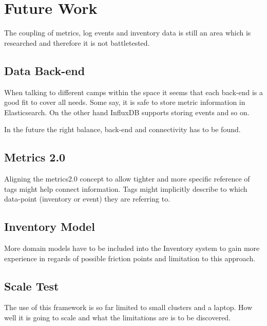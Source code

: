 \section{Future Work}

The coupling of metrics, log events and inventory data is still an area which is researched and therefore it is not battletested.

\subsection{Data Back-end}
When talking to different camps within the space it seems that each back-end is a good fit to cover all needs.
Some say, it is safe to store metric information in Elasticsearch. On the other hand InfluxDB supports storing events and so on.

In the future the right balance, back-end and connectivity has to be found.

\subsection{Metrics 2.0}
Aligning the metrics2.0 concept to allow tighter and more specific reference of tags might help connect information.
Tags might implicitly describe to which data-point (inventory or event) they are referring to.

\subsection{Inventory Model}
More domain models have to be included into the Inventory system to gain more experience in regards of possible friction points and limitation to this approach.

\subsection{Scale Test}
The use of this framework is so far limited to small clusters and a laptop. How well it is going to scale and what the limitations are is to be discovered.
